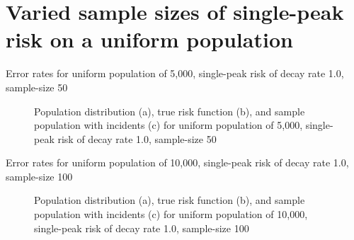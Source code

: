 \section{Varied sample sizes of single-peak risk on a uniform population}
\label{sec:app:results_unifXk_X_1.0_1h}

\graphicspath{{./results/unif5k_50_1.0_1h/}}
\makeatletter
{}
\makeatother

\begin{table}[H]
    
    \caption[]{Error rates for uniform population of 5,000, single-peak risk of decay rate 1.0, sample-size 50}
    \label{tab:mean_error_rates:unif5k_50_1.0_1h}
\end{table}

\begin{figure}[H]
    
    \caption[]{Population distribution (a), true risk function (b), and sample population with incidents (c) for uniform population of 5,000, single-peak risk of decay rate 1.0, sample-size 50}
    \label{fig:distributions:unif5k_50_1.0_1h}    
\end{figure}

\graphicspath{{./results/unif10k_100_1.0_1h/}}
\makeatletter
{}
\makeatother

\begin{table}[H]
    
    \caption[]{Error rates for uniform population of 10,000, single-peak risk of decay rate 1.0, sample-size 100}
    \label{tab:mean_error_rates:unif10k_100_1.0_1h}
\end{table}

\begin{figure}[H]
    
    \caption[]{Population distribution (a), true risk function (b), and sample population with incidents (c) for uniform population of 10,000, single-peak risk of decay rate 1.0, sample-size 100}
    \label{fig:distributions:unif10k_100_1.0_1h}    
\end{figure}


\graphicspath{{./results/unif20k_200_1.0_1h/}}
\makeatletter
{}
\makeatother

